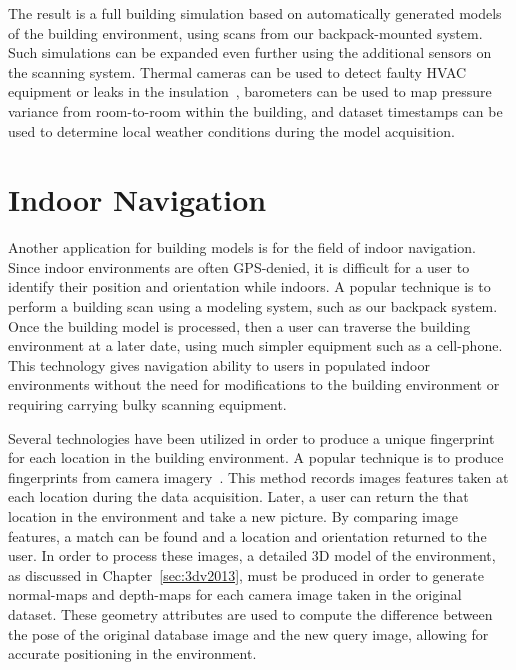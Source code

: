 \documentclass[12pt,onecolumn,oneside]{book}
\begin{document}
The result is a full building simulation based on automatically generated models of the building environment, using scans from our backpack-mounted system.  Such simulations can be expanded even further using the additional sensors on the scanning system.  Thermal cameras can be used to detect faulty HVAC equipment or leaks in the insulation~\cite{Oreifej14}, barometers can be used to map pressure variance from room-to-room within the building, and dataset timestamps can be used to determine local weather conditions during the model acquisition.

\section{Indoor Navigation}
\label{sec:application_indoornav}

Another application for building models is for the field of indoor navigation.  Since indoor environments are often GPS-denied, it is difficult for a user to identify their position and orientation while indoors.  A popular technique is to perform a building scan using a modeling system, such as our backpack system.  Once the building model is processed, then a user can traverse the building environment at a later date, using much simpler equipment such as a cell-phone.  This technology gives navigation ability to users in populated indoor environments without the need for modifications to the building environment or requiring carrying bulky scanning equipment. 

Several technologies have been utilized in order to produce a unique fingerprint for each location in the building environment.  A popular technique is to produce fingerprints from camera imagery~\cite{Liang13}.  This method records images features taken at each location during the data acquisition.  Later, a user can return the that location in the environment and take a new picture.  By comparing image features, a match can be found and a location and orientation returned to the user.  In order to process these images, a detailed 3D model of the environment, as discussed in Chapter~\ref{sec:3dv2013}, must be produced in order to generate normal-maps and depth-maps for each camera image taken in the original dataset.  These geometry attributes are used to compute the difference between the pose of the original database image and the new query image, allowing for accurate positioning in the environment.
\end{document}

